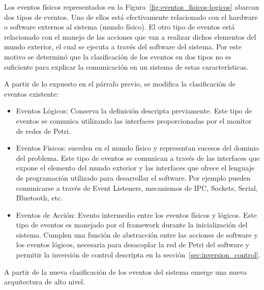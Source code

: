 Los eventos físicos representados en la
Figura~\ref{fig:eventos_fisicos-logicos} abarcan dos tipos de eventos. Uno de
ellos está efectivamente relacionado con el hardware o software externos al
sistema (mundo físico). El otro tipo de eventos está relacionado con el manejo
de las acciones que van a realizar dichos elementos del mundo exterior, el cual
se ejecuta a través del software del sistema.
Por este motivo se determinó que la clasificación de los
eventos en dos tipos no es suficiente para explicar la comunicación en un
sistema de estas características. 

A partir de lo expuesto en el párrafo previo, se modifica la clasificación
de eventos existente:

\begin{itemize}
    \item Eventos Lógicos: Conserva la definición descripta previamente. Este
    tipo de eventos se comunica utilizando las interfaces proporcionadas por el
    monitor de redes de Petri.
    \item Eventos Físicos: suceden en el mundo físico y representan sucesos del
    dominio del problema. Este tipo de eventos se comunican a través de las
    interfaces que expone el elemento del mundo exterior y las interfaces que
    ofrece el lenguaje de programación utilizado para desarrollar el software.
    Por ejemplo pueden comunicarse a través de Event Listeners, mecanismos
    de IPC, Sockets, Serial, Bluetooth, etc.
    \item Eventos de Acción: Evento intermedio
    entre los eventos físicos y lógicos. Este tipo de eventos es manejado
    por el framework durante la inicialización del sistema. Cumplen una función
    de abstracción entre las acciones de software y los eventos lógicos,
    necesaria para desacoplar la red de Petri del software y permitir la
    inversión de control descripta en la sección~\ref{sec:inversion_control}.
\end{itemize}

A partir de la nueva clasificación de los eventos del sistema emerge una nueva
arquitectura de alto nivel.

